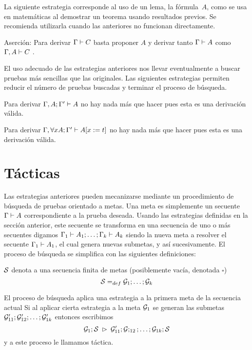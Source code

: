 \documentclass[11pt,letterpaper]{article}
\begin{document}
La siguiente estrategia corresponde al uso de un lema, la fórmula~$A$, como 
se usa en matemáticas al demostrar un teorema usando resultados previos. 
Se recomienda utilizarla cuando las anteriores no funcionan directamente.
\bi
\item Aserción: Para derivar $\Gamma\vdash C$ basta proponer $A$ y derivar tanto
$\Gamma\vdash A$  como  $\Gamma,A\vdash C$ .
\ei

El uso adecuado de las estrategias anteriores nos llevar eventualmente  a 
buscar pruebas más sencillas que las originales. Las siguientes estrategias 
permiten reducir el número de pruebas buscadas y terminar el proceso de búsqueda.
\bi
\item Para derivar $ \Gamma,A;\Gamma'\vdash A $
 no hay nada más que hacer pues esta es una derivación válida.
\item Para derivar $\Gamma,\forall xA;\Gamma'\vdash A[x:=t]$ no hay nada más que 
hacer pues esta es una derivación válida.
\ei

\section{Tácticas}
Las estrategias anteriores pueden mecanizarse mediante un procedimiento de 
búsqueda de pruebas orientado a metas. Una meta es simplemente un 
secuente~$\Gamma\vdash A$ correspondiente a la prueba deseada. Usando las 
estrategias definidas en la sección anterior, este secuente se transforma en 
una secuencia de uno o más secuentes digamos 
$\Gamma_1\vdash A_1;\ldots ;\Gamma_k\vdash A_k$ siendo la nueva meta a 
resolver el secuente $\Gamma_1\vdash A_1$, el cual genera nuevas submetas, y así 
sucesivamente. El proceso de búsqueda se simplifica con las siguientes 
definiciones:
\bi
\item $\mathcal{S}$ denota a una secuencia finita de metas (posiblemente vacía, 
denotada $\square$) 
$$ \mathcal{S}=_{def}\mathcal{G}_1;\ldots;\mathcal{G}_k $$

\item El proceso de búsqueda aplica una estrategia a la primera meta de la 
secuencia actual Si al aplicar cierta estrategia a la meta $\mathcal{G}_1$ se generan 
las submetas 
$\mathcal{G}'_{11};\mathcal{G}'_{12};\ldots;\mathcal{G}'_{1k}$ entonces escribimos
$$ \mathcal{G}_1;\mathcal{S}\;\rhd\;\mathcal{G}'_{11};\mathcal{G};_{12};\ldots;\mathcal{G}_{1k};\mathcal{S} $$
y a este proceso le llamamos táctica.
\end{document}
